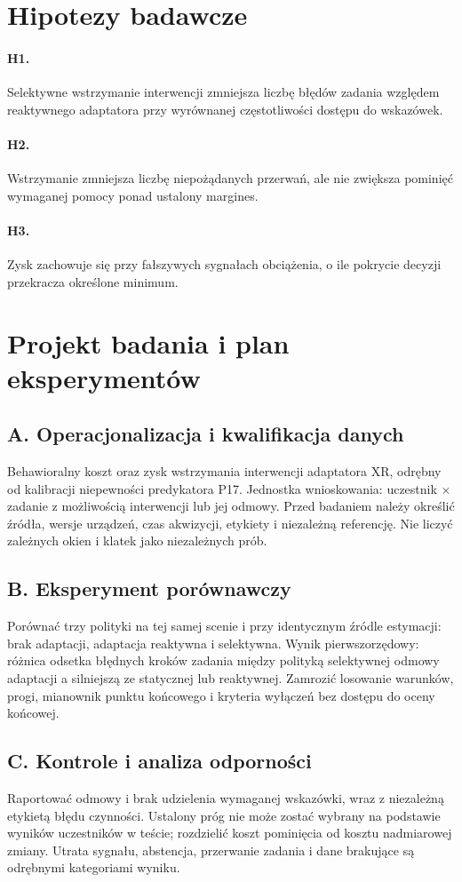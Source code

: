 \documentclass[11pt,a4paper]{article}
\begin{document}
\section{Hipotezy badawcze}
\paragraph{H1.} Selektywne wstrzymanie interwencji zmniejsza liczbę błędów zadania względem reaktywnego adaptatora przy wyrównanej częstotliwości dostępu do wskazówek.
\paragraph{H2.} Wstrzymanie zmniejsza liczbę niepożądanych przerwań, ale nie zwiększa pominięć wymaganej pomocy ponad ustalony margines.
\paragraph{H3.} Zysk zachowuje się przy fałszywych sygnałach obciążenia, o ile pokrycie decyzji przekracza określone minimum.
\section{Projekt badania i plan eksperymentów}
\subsection{A. Operacjonalizacja i kwalifikacja danych}
Behawioralny koszt oraz zysk wstrzymania interwencji adaptatora XR, odrębny od kalibracji niepewności predykatora P17. Jednostka wnioskowania: uczestnik × zadanie z możliwością interwencji lub jej odmowy. Przed badaniem należy określić źródła, wersje urządzeń, czas akwizycji, etykiety i niezależną referencję. Nie liczyć zależnych okien i klatek jako niezależnych prób.
\subsection{B. Eksperyment porównawczy}
Porównać trzy polityki na tej samej scenie i przy identycznym źródle estymacji: brak adaptacji, adaptacja reaktywna i selektywna. Wynik pierwszorzędowy: różnica odsetka błędnych kroków zadania między polityką selektywnej odmowy adaptacji a silniejszą ze statycznej lub reaktywnej. Zamrozić losowanie warunków, progi, mianownik punktu końcowego i kryteria wyłączeń bez dostępu do oceny końcowej.
\subsection{C. Kontrole i analiza odporności}
Raportować odmowy i brak udzielenia wymaganej wskazówki, wraz z niezależną etykietą błędu czynności. Ustalony próg nie może zostać wybrany na podstawie wyników uczestników w teście; rozdzielić koszt pominięcia od kosztu nadmiarowej zmiany. Utrata sygnału, abstencja, przerwanie zadania i dane brakujące są odrębnymi kategoriami wyniku.
\end{document}
